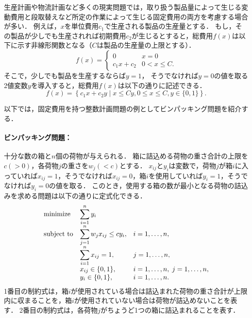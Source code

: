 \documentclass[japanese]{jnlp_1.4}
\begin{document}
生産計画や物流計画など多くの現実問題では，取り扱う製品量によって生じる変動費用と段取替えなど所定の作業によって生じる固定費用の両方を考慮する場合が多い．
例えば，$x$を単位費用$c_1$で生産される製品の生産量とする．
もし，その製品が少しでも生産されれば初期費用$c_2$が生じるとすると，総費用$f(x)$は以下に示す非線形関数となる（$C$は製品の生産量の上限とする）．
\begin{equation}
f(x) = \left\{
\begin{array}{ll}
0 & x=0 \\
c_1 x + c_2 & 0 < x \le C.
\end{array}
\right.
\end{equation}
そこで，少しでも製品を生産するならば$y=1$，
\pagebreak
そうでなければ$y=0$の値を取る2値変数$y$を導入すると，総費用$f(x)$は以下の通りに記述できる．
\begin{equation}
f(x) = \left\{ c_1 x + c_2 y \mid x \le C y, 0 \le x \le C, y \in \{ 0,1 \} \right\}.
\end{equation}

以下では，固定費用を持つ整数計画問題の例としてビンパッキング問題を紹介する．

\paragraph{ビンパッキング問題：}
十分な数の箱と$n$個の荷物が与えられる．
箱に詰込める荷物の重さ合計の上限を$c (> 0)$，各荷物$j$の重さを$w_j (< c)$とする．
$x_{ij}$と$y_i$は変数で，荷物$j$が箱$i$に入っていれば$x_{ij}=1$，そうでなければ$x_{ij}=0$，箱$i$を使用していれば$y_i=1$，そうでなければ$y_i=0$の値を取る．
このとき，使用する箱の数が最小となる荷物の詰込みを求める問題は以下の通りに定式化できる．
\begin{equation}
\begin{array}{lll}
\textnormal{minimize} & \displaystyle\sum_{i=1}^n y_i & \\
\textnormal{subject to} & \displaystyle\sum_{j=1}^n w_j x_{ij} \le c y_i, & i=1,\dots,n,\\
 & \displaystyle\sum_{i=1}^n x_{ij} = 1, & j=1,\dots,n,\\
 & x_{ij} \in \{ 0,1 \}, & i=1,\dots,n, \; j=1,\dots,n,\\
 & y_i \in \{ 0,1 \}, & i=1,\dots,n.
\end{array}
\end{equation}
1番目の制約式は，箱$i$が使用されている場合は詰込まれた荷物の重さ合計が上限内に収まることを，箱$i$が使用されていない場合は荷物が詰込めないことを表す．
2番目の制約式は，各荷物$j$がちょうど1つの箱に詰込まれることを表す．
\end{document}
